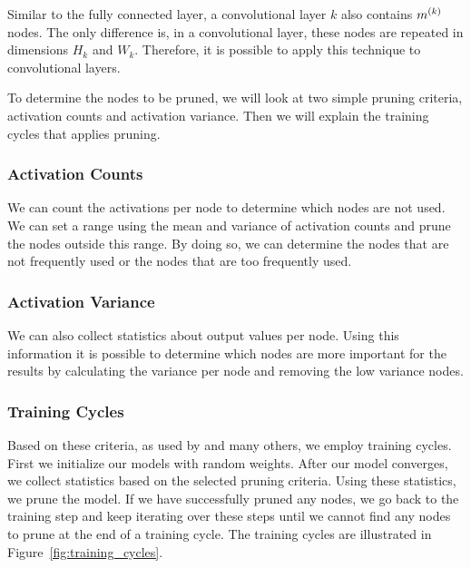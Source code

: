 Similar to the fully connected layer, a convolutional layer $k$ also contains $m^{(k)}$ nodes. The only difference is, in a convolutional layer, these nodes are repeated in dimensions $H_k$ and $W_k$. Therefore, it is possible to apply this technique to convolutional layers. 

To determine the nodes to be pruned, we will look at two simple pruning criteria, activation counts and activation variance. Then we will explain the training cycles that applies pruning.

\subsubsection{Activation Counts}
We can count the activations per node to determine which nodes are not used. We can set a range using the mean and variance of activation counts and prune the nodes outside this range. By doing so, we can determine the nodes that are not frequently used or the nodes that are too frequently used.

\subsubsection{Activation Variance}
We can also collect statistics about output values per node. Using this information it is possible to determine which nodes are more important for the results by calculating the variance per node and removing the low variance nodes. 

\subsubsection{Training Cycles}
Based on these criteria, as used by \cite{Hu:2016aa} and many others, we employ training cycles. First we initialize our models with random weights. After our model converges, we collect statistics based on the selected pruning criteria. Using these statistics, we prune the model. If we have successfully pruned any nodes, we go back to the training step and keep iterating over these steps until we cannot find any nodes to prune at the end of a training cycle. The training cycles are illustrated in Figure~\ref{fig:training_cycles}.

